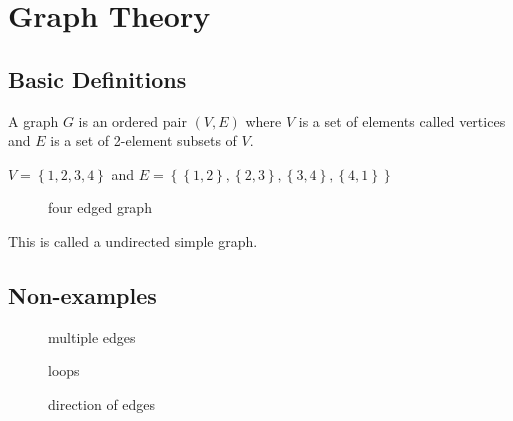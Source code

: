 \documentclass[../main.tex]{subfiles}
\begin{document}
\section{Graph Theory}
\subsection{Basic Definitions}
\begin{defn}[Graph]
	A graph $G$  is an ordered pair $( V,E) $ where $V$ is a set of elements called vertices and $E$ is a set of 2-element subsets of $V$.	
\end{defn}
\begin{exemple}
$V = \left\{ 1,2,3,4 \right\} $ and $E = \left\{ \left\{ 1,2 \right\}, \left\{ 2,3 \right\} , \left\{ 3,4 \right\} , \left\{ 4,1 \right\}   \right\} $
\begin{figure}[H]
    \centering
    \caption{four edged graph}
    \label{fig:four-edged-graph}
\end{figure}
This is called a undirected simple graph.
\end{exemple}
\subsection*{Non-examples}
\begin{figure}[H]
    \centering
    \caption{multiple edges}
    \label{fig:multiple-edges}
\end{figure}
\begin{figure}[H]
    \centering
    \caption{loops}
    \label{fig:loops}
\end{figure}
\begin{figure}[H]
    \centering
    \caption{direction of edges}
    \label{fig:direction-of-edges}
\end{figure}
\end{document}
